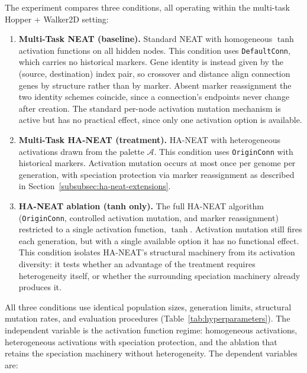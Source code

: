 \documentclass[12pt]{article}
\begin{document}
The experiment compares three conditions, all operating within the multi-task Hopper + Walker2D setting:

\begin{enumerate}
    \item \textbf{Multi-Task NEAT (baseline).} Standard NEAT with homogeneous $\tanh$ activation functions on all hidden nodes. This condition uses \texttt{DefaultConn}, which carries no historical markers. Gene identity is instead given by the (source, destination) index pair, so crossover and distance align connection genes by structure rather than by marker. Absent marker reassignment the two identity schemes coincide, since a connection's endpoints never change after creation. The standard per-node activation mutation mechanism is active but has no practical effect, since only one activation option is available.

    \item \textbf{Multi-Task HA-NEAT (treatment).} HA-NEAT with heterogeneous activations drawn from the palette $\mathcal{A}$. This condition uses \texttt{OriginConn} with historical markers. Activation mutation occurs at most once per genome per generation, with speciation protection via marker reassignment as described in Section~\ref{subsubsec:ha-neat-extensions}.

    \item \textbf{HA-NEAT ablation (tanh only).} The full HA-NEAT algorithm (\texttt{OriginConn}, controlled activation mutation, and marker reassignment) restricted to a single activation function, $\tanh$. Activation mutation still fires each generation, but with a single available option it has no functional effect. This condition isolates HA-NEAT's structural machinery from its activation diversity: it tests whether an advantage of the treatment requires heterogeneity itself, or whether the surrounding speciation machinery already produces it.
\end{enumerate}

All three conditions use identical population sizes, generation limits, structural mutation rates, and evaluation procedures (Table~\ref{tab:hyperparameters}).
The independent variable is the activation function regime: homogeneous activations, heterogeneous activations with speciation protection, and the ablation that retains the speciation machinery without heterogeneity.
The dependent variables are:
\end{document}
